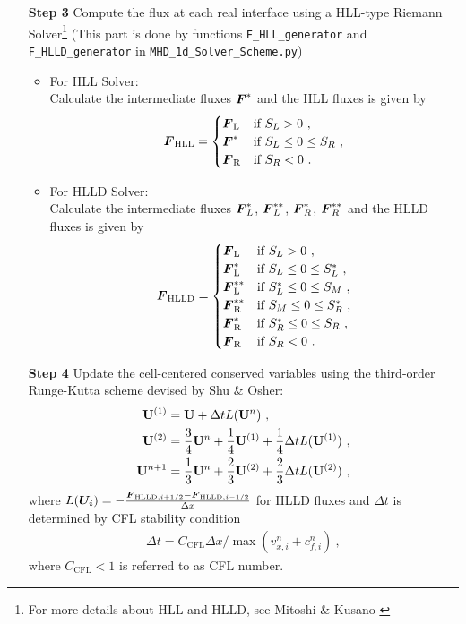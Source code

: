\documentclass[10.5pt]{article}
\begin{document}
\begin{enumerate}
	\item[\textbf{Step 3}] Compute the flux at each real interface using a HLL-type 
	Riemann Solver\footnote{For more details about HLL and HLLD, 
	see Mitoshi \& Kusano \cite{miyoshi2005multi}} (This part is done by functions
	\texttt{F\_HLL\_generator} and \texttt{F\_HLLD\_generator} in
	\texttt{MHD\_1d\_Solver\_Scheme.py})
	\begin{itemize}
		\item For HLL Solver:\\
			Calculate the intermediate fluxes $\vb*{F}^*$ and the HLL fluxes is given by 
			\begin{align}
			\vb*{F}_{\text{HLL}} = \begin{cases}
				\vb*{F}_{\text{L}} & \text{if } S_L>0 \ ,  \\
				\vb*{F}^* & \text{if } S_L \leq 0 \leq S_R \ , \\
				\vb*{F}_{\text{R}} & \text{if } S_R<0 \ .
				\end{cases}
			\end{align}	
		\item For HLLD Solver:\\
			Calculate the intermediate fluxes $\vb*{F}_L^*$, 
			$\vb*{F}_L^{**}$, $\vb*{F}_R^*$, $\vb*{F}_R^{**}$  and the HLLD fluxes is given by 
			\begin{align}
				\vb*{F}_{\text{HLLD}} = \begin{cases}
				\vb*{F}_{\text{L}} & \text{if } S_L>0 \ ,  \\
				\vb*{F}^*_{\text{L}} & \text{if } S_L \leq 0 \leq S^*_L \ , \\
				\vb*{F}^{**}_{\text{L}} & \text{if } S^*_L \leq 0 \leq S_M \ , \\
				\vb*{F}^{**}_{\text{R}} & \text{if } S_M \leq 0 \leq S^*_R \ , \\
				\vb*{F}^{*}_{\text{R}} & \text{if } S^*_R \leq 0 \leq S_R \ , \\
				\vb*{F}_{\text{R}} & \text{if } S_R<0 \ .
				\end{cases}
			\end{align}	
	\end{itemize}
	\item[\textbf{Step 4}] Update the cell-centered conserved variables using the third-order 
	Runge-Kutta scheme devised by Shu \& Osher:
	\begin{align}
	\vb{U}^{(1)}&=\vb{U} + \Delta t L(\vb{U}^n) \ , \\
	\vb{U}^{(2)} &= \frac{3}{4} \vb{U}^n + \frac{1}{4} \vb{U}^{(1)}+\frac{1}{4}\Delta t L(\vb{U}^{(1)}) 	\ , \\
	\vb{U}^{n+1}&=\frac{1}{3} \vb{U}^n + \frac{2}{3} \vb{U}^{(2)} +\frac{2}{3}\Delta t L(\vb{U}^{(2)}) 	\ ,
	\end{align}
	where $L(\vb*{U_i}) = -\frac{\vb*{F}_{\text{HLLD},i+1/2} - \vb*{F}_{\text{HLLD},i-1/2}}
	{\Delta x}$ for HLLD fluxes and $\Delta t$ is determined by CFL stability condition
	\begin{align}
		\Delta t = C_{\text{CFL}} \Delta x/\max (v^n_{x,i} + c^n_{f,i})\ ,
	\end{align}
	where $C_{\text{CFL}}<1$ is referred to as CFL number.
\end{enumerate}
\end{document}
